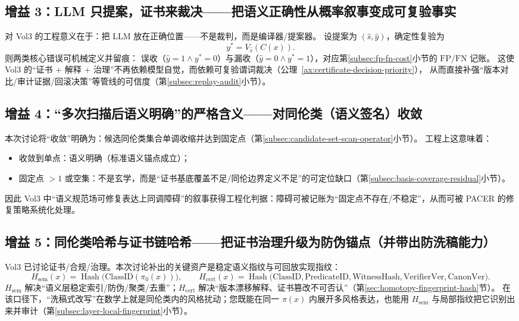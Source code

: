 \documentclass[12pt]{article}
\begin{document}
\begin{CJK*}{UTF8}{gkai}
\subsection{增益 3：LLM 只提案，证书来裁决——把语义正确性从概率叙事变成可复验事实}
\label{subsec:vol3-gain-3-llm-propose}

对 Vol3 的工程意义在于：把 LLM 放在正确位置——不是裁判，而是编译器/提案器。
设提案为 $(\hat{s},\hat{y})$，确定性复验为
\[
y^\ast = V_{\hat{s}}(C(x)).
\]
则两类核心错误可机械定义并留痕：
误收（$\hat{y}=1 \wedge y^\ast=0$）与漏收（$\hat{y}=0 \wedge y^\ast=1$），对应第\ref{subsec:fp-fn-cost}小节的 $\mathrm{FP}/\mathrm{FN}$
  记账。
这使 Vol3 的“证书 + 解释 + 治理”不再依赖模型自觉，而依赖可复验谓词裁决（公理~\ref{ax:certificate-decision-priority}），
从而直接补强“版本对比/审计证据/回滚决策”等管线的可信度（第\ref{subsec:replay-audit}小节）。

\subsection{增益 4：“多次扫描后语义明确”的严格含义——对同伦类（语义签名）收敛}
\label{subsec:vol3-gain-4-convergence}

本次讨论将“收敛”明确为：候选同伦类集合单调收缩并达到固定点（第\ref{subsec:candidate-set-scan-operator}小节）。
工程上这意味着：
\begin{itemize}
  \item 收敛到单点：语义明确（标准语义锚点成立）；
  \item 固定点 $>1$ 或空集：不是玄学，而是“证书基底覆盖不足/同伦边界定义不足”的可定位缺口（第\ref{subsec:basis-coverage-residual}小节）。
\end{itemize}
因此 Vol3 中“语义规范场可修复表达上同调障碍”的叙事获得工程化判据：障碍可被记账为“固定点不存在/不稳定”，从而可被 PACER 的修复策略系统化处理。

\subsection{增益 5：同伦类哈希与证书链哈希——把证书治理升级为防伪锚点（并带出防洗稿能力）}
\label{subsec:vol3-gain-5-hash}

Vol3 已讨论证书/合规/治理。本次讨论补出的关键资产是稳定语义指纹与可回放实现指纹：
\[
H_{\mathrm{sem}}(x)=\operatorname{Hash}\bigl(\mathrm{ClassID}(\pi_0(x))\bigr),
\qquad
H_{\mathrm{cert}}(x)=\operatorname{Hash}\bigl(\mathrm{ClassID},\mathrm{PredicateID},\mathrm{WitnessHash},
  \mathrm{VerifierVer},\mathrm{CanonVer}\bigr).
\]
$H_{\mathrm{sem}}$ 解决“语义层稳定索引/防伪/聚类/去重”；$H_{\mathrm{cert}}$ 解决“版本漂移解释、证书篡改不可否认”（第\ref{sec:homotopy-fingerprint-hash}节）。
在该口径下，“洗稿式改写”在数学上就是同伦类内的风格扰动；您既能在同一 $\pi(x)$ 内展开多风格表达，也能用 $H_{\mathrm{sem}}$ 与局部指纹把它识别出来并审计（第\ref{subsec:layer-local-fingerprint}小节）。


\end{CJK*}
\end{document}

